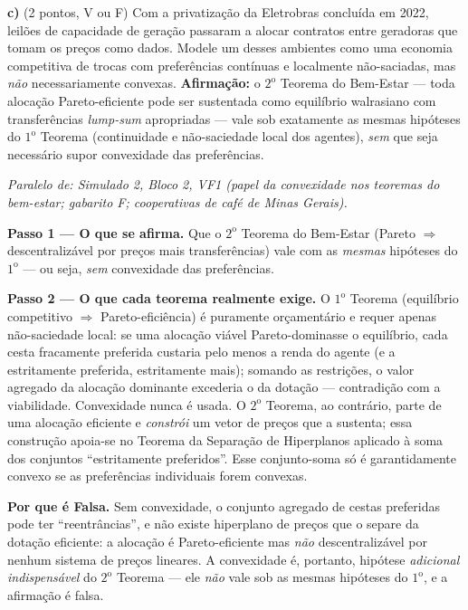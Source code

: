\textbf{c)} (2 pontos, V ou F) Com a privatização da Eletrobras concluída em 2022, leilões de capacidade de geração passaram a alocar contratos entre geradoras que tomam os preços como dados. Modele um desses ambientes como uma economia competitiva de trocas com preferências contínuas e localmente não-saciadas, mas \emph{não} necessariamente convexas. \textbf{Afirmação:} o $2^{\text{o}}$ Teorema do Bem-Estar --- toda alocação Pareto-eficiente pode ser sustentada como equilíbrio walrasiano com transferências \emph{lump-sum} apropriadas --- vale sob exatamente as mesmas hipóteses do $1^{\text{o}}$ Teorema (continuidade e não-saciedade local dos agentes), \emph{sem} que seja necessário supor convexidade das preferências.

\begin{solucao}
{\footnotesize\textit{Paralelo de: Simulado 2, Bloco 2, VF1 (papel da convexidade nos teoremas do bem-estar; gabarito F; cooperativas de café de Minas Gerais).}}\par\vspace{0.2em}
\textbf{Passo 1 --- O que se afirma.} Que o $2^{\text{o}}$ Teorema do Bem-Estar (Pareto $\Rightarrow$ descentralizável por preços mais transferências) vale com as \emph{mesmas} hipóteses do $1^{\text{o}}$ --- ou seja, \emph{sem} convexidade das preferências.

\textbf{Passo 2 --- O que cada teorema realmente exige.} O $1^{\text{o}}$ Teorema (equilíbrio competitivo $\Rightarrow$ Pareto-eficiência) é puramente orçamentário e requer apenas não-saciedade local: se uma alocação viável Pareto-dominasse o equilíbrio, cada cesta fracamente preferida custaria pelo menos a renda do agente (e a estritamente preferida, estritamente mais); somando as restrições, o valor agregado da alocação dominante excederia o da dotação --- contradição com a viabilidade. Convexidade nunca é usada. O $2^{\text{o}}$ Teorema, ao contrário, parte de uma alocação eficiente e \emph{constrói} um vetor de preços que a sustenta; essa construção apoia-se no Teorema da Separação de Hiperplanos aplicado à soma dos conjuntos ``estritamente preferidos''. Esse conjunto-soma só é garantidamente convexo se as preferências individuais forem convexas.

\textbf{Por que é Falsa.} Sem convexidade, o conjunto agregado de cestas preferidas pode ter ``reentrâncias'', e não existe hiperplano de preços que o separe da dotação eficiente: a alocação é Pareto-eficiente mas \emph{não} descentralizável por nenhum sistema de preços lineares. A convexidade é, portanto, hipótese \emph{adicional indispensável} do $2^{\text{o}}$ Teorema --- ele \emph{não} vale sob as mesmas hipóteses do $1^{\text{o}}$, e a afirmação é falsa.


\end{solucao}
